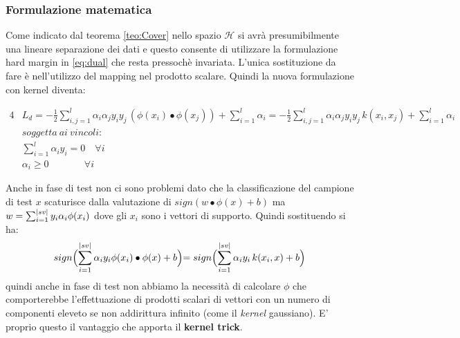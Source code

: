\subsubsection{Formulazione matematica}
Come indicato dal teorema \ref{teo:Cover} nello spazio $\mathcal{H}$ si avrà presumibilmente una lineare separazione dei dati e questo consente di utilizzare la formulazione hard margin in \eqref{eq:dual}  che resta pressochè invariata. L'unica sostituzione da fare è nell'utilizzo del mapping nel prodotto scalare. Quindi la nuova formulazione  con kernel diventa:

\begin{alignat}{4}
& L_{d} = - \frac{1}{2} \sum_{i,j = 1}^{l}\alpha_{i}\alpha_{j}y_{i}y_{j}\,(\phi(x_{i}) \bullet \phi(x_{j})) + \sum_{i=1}^{l}\alpha_{i} = - \frac{1}{2} \sum_{i,j = 1}^{l}\alpha_{i}\alpha_{j}y_{i}y_{j}\,k(x_{i} ,  x_{j}) + \sum_{i=1}^{l}\alpha_{i} \label{eq:Kerdual}\\
& soggetta \:ai\:vincoli: \nonumber\\
&\sum_{i=1}^{l}\alpha_{i}y_{i} = 0 \quad \forall i \nonumber\\
&\alpha_{i} \geq 0 \qquad \quad\:\:\: \forall i \nonumber
\end{alignat}

Anche in fase di test non ci sono problemi dato che  la classificazione del campione di test $x$ scaturisce dalla valutazione di $sign(w \bullet \phi(x) +b)$ ma $w = \sum_{i =1}^{\lvert sv\rvert}y_i\alpha_i\phi(x_i)$ dove gli $x_i$ sono i vettori di supporto. Quindi sostituendo si ha:
\begin{equation}
sign\Bigl(\sum_{i=1}^{\lvert sv\rvert}\alpha_iy_i\phi(x_i) \bullet \phi(x) + b \Bigl)= sign\Bigl(\sum_{i=1}^{\lvert sv\rvert}\alpha_iy_i\,k(x_i , x) + b\Bigl)
\end{equation}
quindi anche in fase di test non abbiamo la necessità di calcolare $\phi$ che comporterebbe l'effettuazione di prodotti scalari di vettori con un numero di componenti eleveto se non addirittura infinito (come il \textit{kernel} gaussiano). E' proprio questo il vantaggio che apporta il \textbf{kernel trick}.


